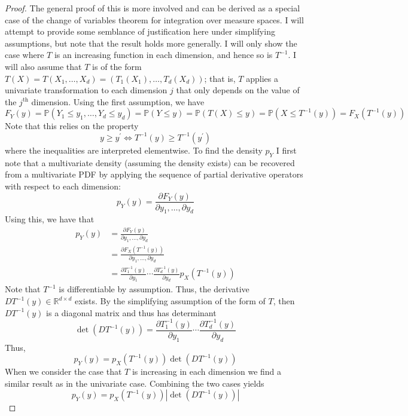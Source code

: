 \documentclass[12pt]{article}
\newcommand*{\abs}[1]{\left\lvert#1\right\rvert}
\newcommand{\R}{\mathcal{R}}
\newcommand{\Prob}{\mathbb{P}}
\def\R{\mathbb{R}}
\begin{document}
\begin{proof}
The general proof of this is more involved and can be derived as a special case of the change of variables theorem for integration over measure 
spaces. I will attempt to provide some semblance of justification here under simplifying assumptions, but note that the result holds more generally. 
I will only show the case where $T$ is an increasing function in each dimension, and hence so is $T^{-1}$. I will also assume that 
$T$ is of the form $T(X) = T(X_1, \dots, X_d) = (T_1(X_1), \dots, T_d(X_d))$; that is, $T$ applies a univariate transformation to each dimension $j$ that 
only depends on the value of the $j^{\text{th}}$ dimension. Using the first assumption, we have 
\[F_Y(y) = \Prob(Y_1 \leq y_1, \dots, Y_d \leq y_d) = \Prob(Y \leq y) = \Prob(T(X) \leq y) = \Prob(X \leq T^{-1}(y)) = F_X(T^{-1}(y))\]
Note that this relies on the property 
\[y \geq y^\prime \iff T^{-1}(y) \geq T^{-1}(y^\prime)\]
where the inequalities are interpreted elementwise. To find the density $p_Y$ I first note that a multivariate density (assuming the density exists) can be recovered 
from a multivariate PDF by applying the sequence of partial derivative operators with respect to each dimension:
\[p_Y(y) = \frac{\partial F_Y(y)}{\partial y_1, \dots, \partial y_d}\]
Using this, we have that
\begin{align*}
p_Y(y) &= \frac{\partial F_Y(y)}{\partial y_1, \dots, \partial y_d} \\
	   &= \frac{\partial F_X(T^{-1}(y))}{\partial y_1, \dots, \partial y_d} \\
	   &= \frac{\partial T_1^{-1}(y)}{\partial y_1} \cdots \frac{\partial T_d^{-1}(y)}{\partial y_d} p_X(T^{-1}(y))
\end{align*}
Note that $T^{-1}$ is differentiable by assumption. Thus, the derivative $D T^{-1}(y) \in \R^{d \times d}$ exists. By the simplifying assumption of the form of $T$, then 
$D T^{-1}(y)$ is a diagonal matrix and thus has determinant
\[\det\left(D T^{-1}(y)\right) = \frac{\partial T_1^{-1}(y)}{\partial y_1} \cdots \frac{\partial T_d^{-1}(y)}{\partial y_d} \]
Thus, 
\[p_Y(y) = p_X(T^{-1}(y)) \det\left(D T^{-1}(y)\right) \]
When we consider the case that $T$ is increasing in each dimension we find a similar result as in the univariate case. Combining the two cases yields 
\[p_Y(y) = p_X(T^{-1}(y)) \abs{\det\left(D T^{-1}(y)\right)} \]
\end{proof}
\end{document}
